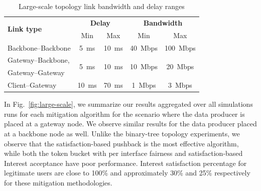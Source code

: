 \documentclass[10pt,conference]{IEEEtran}
\begin{document}
{\begin{table}[t]
\centering
\caption{Large-scale topology link bandwidth and delay ranges}
\label{tab:large-scale}
\begin{tabular}{|l||c|c||c|c|}
  \hline
  \multirow{2}{*}{\bf Link type} &  \multicolumn{2}{|c||}{\bf Delay} &  \multicolumn{2}{|c|}{\bf Bandwidth} \tabularnewline
  \cline{2-5}
                        &  Min & Max                       &  Min & Max \tabularnewline
  \hline \hline
  Backbone--Backbone    & 5~ms & 10~ms   & 40~Mbps & 100~Mbps \tabularnewline
  \hline
  Gateway--Backbone,    & \multirow{2}{*}{5~ms} & \multirow{2}{*}{10~ms}   
                        & \multirow{2}{*}{10~Mbps} & \multirow{2}{*}{20~Mbps} \tabularnewline
  Gateway--Gateway      & & & & \\
  \hline
  Client--Gateway       & 10~ms & 70~ms   & 1~Mbps  & 3~Mbps \\
  \hline
\end{tabular}
\end{table}




In Fig.~\ref{fig:large-scale}, we summarize our results aggregated over all simulations runs for each mitigation algorithm for the scenario where the data producer is placed at a gateway node. We observe similar results for the data producer placed at a backbone node as well. Unlike the binary-tree topology experiments, we observe that the satisfaction-based pushback is the most effective algorithm, while both the token bucket with per interface fairness and satisfaction-based Interest acceptance have poor performance.  Interest satisfaction percentage for legitimate users are close to 100\% and approximately 30\% and 25\% respectively for these mitigation methodologies.

}
\end{document}
